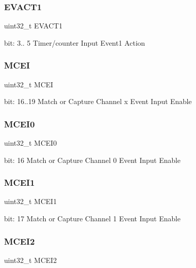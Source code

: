\subsubsection{\texorpdfstring{EVACT1}{EVACT1}}
{\footnotesize\ttfamily uint32\+\_\+t E\+V\+A\+C\+T1}

bit\+: 3.. 5 Timer/counter Input Event1 Action \mbox{\label{union_t_c_c___e_v_c_t_r_l___type_a981f880af570ebc703c40e692fe54a28}} 
\subsubsection{\texorpdfstring{MCEI}{MCEI}}
{\footnotesize\ttfamily uint32\+\_\+t M\+C\+EI}

bit\+: 16..19 Match or Capture Channel x Event Input Enable \mbox{\label{union_t_c_c___e_v_c_t_r_l___type_ac05965263422f3ee2545fabd9bfead1f}} 
\subsubsection{\texorpdfstring{MCEI0}{MCEI0}}
{\footnotesize\ttfamily uint32\+\_\+t M\+C\+E\+I0}

bit\+: 16 Match or Capture Channel 0 Event Input Enable \mbox{\label{union_t_c_c___e_v_c_t_r_l___type_a547075456ef49ba76a1cedda29163f73}} 
\subsubsection{\texorpdfstring{MCEI1}{MCEI1}}
{\footnotesize\ttfamily uint32\+\_\+t M\+C\+E\+I1}

bit\+: 17 Match or Capture Channel 1 Event Input Enable \mbox{\label{union_t_c_c___e_v_c_t_r_l___type_aa8cfadab69a9aae49d2870eade48dd71}} 
\subsubsection{\texorpdfstring{MCEI2}{MCEI2}}
{\footnotesize\ttfamily uint32\+\_\+t M\+C\+E\+I2}

